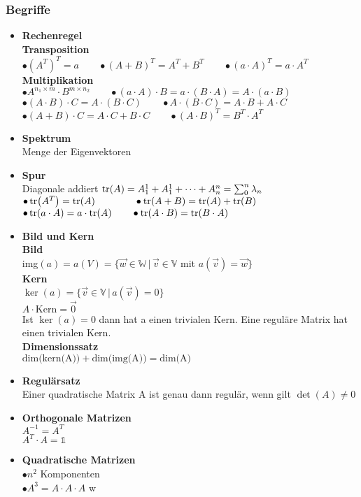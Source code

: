 \subsubsection{Begriffe}
\begin{itemize}
    \item \textbf{Rechenregel}\\
    \textbf{Transposition}\\ 
    $\bullet  (A^T)^T = a \qquad \bullet (A + B)^T = A^T + B^T \qquad \bullet (a \cdot A)^T = a \cdot A^T$\\
    \textbf{Multiplikation}\\
    $\bullet A^{n_1 \times m} \cdot B^{m \times n_2} \qquad \bullet (a \cdot A) \cdot B = a \cdot (B \cdot A) = A \cdot (a \cdot B)$\\
    $\bullet (A \cdot B) \cdot C = A \cdot (B \cdot C) \qquad \bullet A \cdot (B \cdot C) = A \cdot B + A \cdot C$\\
    $\bullet (A + B) \cdot C = A \cdot C + B \cdot C \qquad \bullet (A \cdot B)^T = B^T \cdot A^T$
    \item \textbf{Spektrum}\\
    Menge der Eigenvektoren
    \item \textbf{Spur}\\ 
    Diagonale addiert $\tr(A) = A_1^1 + A_1^1 + \cdots + A_n^n = \sum_{0}^{n}{\lambda_{n}}$\\
    $\bullet \tr(A^T) = \tr(A) \qquad \qquad \bullet \tr(A + B) = \tr(A) + \tr(B)$\\
    $\bullet \tr(a \cdot A) = a \cdot \tr(A) \qquad \bullet \tr(A \cdot B) = \tr(B \cdot A)$
    \item \textbf{Bild und Kern}\\ 
    \textbf{Bild}\\
    img$(a) = a(V) = \{\vec{w} \in \mathbb{W} \,|\, \vec{v} \in \mathbb{V}$ mit $a(\vec{v}) = \vec{w}\}$\\
    \textbf{Kern}\\
    $\ker(a) = \{\vec{v} \in \mathbb{V} \,|\, a(\vec{v}) = 0\}$\\
    $A \cdot \text{Kern} = \vec{0}$\\
    Ist $\ker(a) = 0$ dann hat a einen trivialen Kern. Eine reguläre Matrix hat einen trivialen Kern.\\
    \textbf{Dimensionssatz}\\
    $\text{dim(kern(A))} + \text{dim(img(A))} = \text{dim(A)}$\\
    \item \textbf{Regulärsatz}\\ 
    Einer quadratische Matrix A ist genau dann regulär, wenn gilt $\det(A) \ne 0$
    \item \textbf{Orthogonale Matrizen}\\
    $A^{-1} = A^T$\\
    $A^T \cdot A = \mathds{1}$
    \item \textbf{Quadratische Matrizen}\\
    $\bullet n^2$ Komponenten\\
    $\bullet A^3 = A \cdot A \cdot A$
w
\end{itemize}